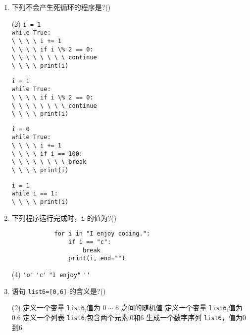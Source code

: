 \documentclass[11pt]{ctexart}
\begin{document}
\begin{enumerate}
        \item  下列不会产生死循环的程序是?(\qquad)
        \begin{tasks}(2)
            \task \lstinline{i = 1}\\
            \lstinline{while True:}\\
            \lstinline{\ \ \ \ i += 1}\\
            \lstinline{\ \ \ \ if i \% 2 == 0:}\\
            \lstinline{\ \ \ \ \ \ \ \ continue}\\
            \lstinline{\ \ \ \ print(i)}

            \task \lstinline{i = 1}\\
            \lstinline{while True:}\\
            \lstinline{\ \ \ \ if i \% 2 == 0:}\\
            \lstinline{\ \ \ \ \ \ \ \ continue}\\
            \lstinline{\ \ \ \ print(i)}

            \task \lstinline{i = 0}\\
            \lstinline{while True:}\\
            \lstinline{\ \ \ \ i += 1}\\
            \lstinline{\ \ \ \ if i == 100:}\\
            \lstinline{\ \ \ \ \ \ \ \ break}\\
            \lstinline{\ \ \ \ print(i)}

            \task \lstinline{i = 1}\\
            \lstinline{while i == 1:}\\
            \lstinline{\ \ \ \ print(i)}
        \end{tasks}

        \item 下列程序运行完成时，\lstinline{i} 的值为?(\qquad)
        \begin{lstlisting}
            for i in "I enjoy coding.":
                if i == "c":
                    break
                print(i, end="")
        \end{lstlisting}
        \begin{tasks}(4)
            \task \lstinline!'o'!
            \task \lstinline!'c'!
            \task \lstinline!"I enjoy"!
            \task \lstinline!''!
        \end{tasks}

        \item  语句 \lstinline!list6=[0,6]! 的含义是?(\qquad)
        \begin{tasks}(2)
            \task 定义一个变量 \lstinline{list6},值为 $0\sim 6$ 之间的随机值
            \task 定义一个变量 \lstinline{list6},值为0.6
            \task 定义一个列表 \lstinline{list6},包含两个元素:0和6
            \task 生成一个数字序列 \lstinline{list6}，值为0到6
        \end{tasks}


\end{enumerate}
\end{document}
